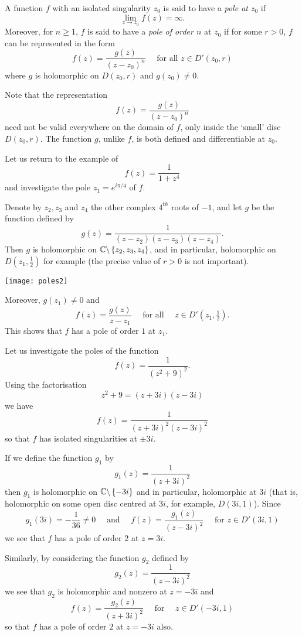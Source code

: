 \begin{definition}
A function $f$ with an isolated singularity $z_0$ is said to have a \emph{pole at $z_0$} if
\[
\lim_{z \to z_0} f(z) = \infty.
\]
Moreover, for $n \geq 1$, $f$ is said to have a \emph{pole of order $n$} at $z_0$ if for some $r>0$, $f$ can be represented in the form
\[
f(z) = \frac{g(z)}{(z-z_0)^n}\quad\text{ for all } z \in D'(z_0,r)
\]
where $g$ is holomorphic on $D(z_0,r)$ and $g(z_0) \neq 0$.
\end{definition}
Note that the representation
\[
f(z) = \frac{g(z)}{(z-z_0)^n}
\]
need not be valid everywhere on the domain of $f$, only inside the `small' disc $D(z_0,r)$.  The function $g$, unlike $f$, is both defined and differentiable at $z_0$.

\begin{example}
Let us return to the example of
\[
f(z) = \frac{1}{1+z^4}
\]
and investigate the pole $z_1 = e^{i\pi/4}$ of $f$.

Denote by $z_2,z_3$ and $z_4$ the other complex $4^{th}$ roots of $-1$, and let $g$ be the function defined by
\[
g(z) = \frac{1}{(z-z_2)(z-z_3)(z-z_4)}.
\]
Then $g$ is holomorphic on $\mathbb{C} \backslash \left\{z_2,z_3,z_4\right\}$, and in particular, holomorphic on $D(z_1,\frac{1}{2})$ for example (the precise value of $r>0$ is not important).
\begin{center}
\texttt{[image: poles2]}
\end{center}
Moreover, $g(z_1) \neq 0$ and
\[
f(z) = \frac{g(z)}{z-z_1} \quad \text{ for all }\quad z \in D'(z_1,\tfrac{1}{2}).
\]
This shows that $f$ has a pole of order $1$ at $z_1$.
\end{example}








\begin{example}
\label{e:poles2}
Let us investigate the poles of  the function
\[
f(z) = \frac{1}{(z^2+9)^2}.
\]
Using the factorisation
\[
z^2+9 = (z+3i)(z-3i)
\]
we have
\[
f(z)= \frac{1}{(z+3i)^2(z-3i)^2}
\]
so that $f$ has isolated singularities at $\pm 3i$.

If we define the function $g_1$ by
\[
g_1(z) = \frac{1}{(z+3i)^2}
\]
then $g_1$ is holomorphic on $\mathbb{C} \backslash \left\{-3i\right\}$ and in particular, holomorphic at $3i$ (that is, holomorphic on some open disc centred at $3i$, for example, $D(3i,1)$).  Since
\[
g_1(3i) = - \frac{1}{36} \neq 0 \quad\text{ and }\quad f(z) = \frac{g_1(z)}{(z-3i)^2} \quad\text{ for } z \in D'(3i,1)
\]
we see that $f$ has a pole of order $2$ at $z=3i$.

Similarly, by considering the function $g_2$ defined by
\[
g_2(z) = \frac{1}{(z-3i)^2}
\]
we see that $g_2$ is holomorphic and nonzero at $z=-3i$ and
\[
f(z) = \frac{g_2(z)}{(z+3i)^2}\quad\text{ for }\quad z \in D'(-3i,1)
\]
so that $f$ has a pole of order $2$ at $z=-3i$ also.
\end{example}

